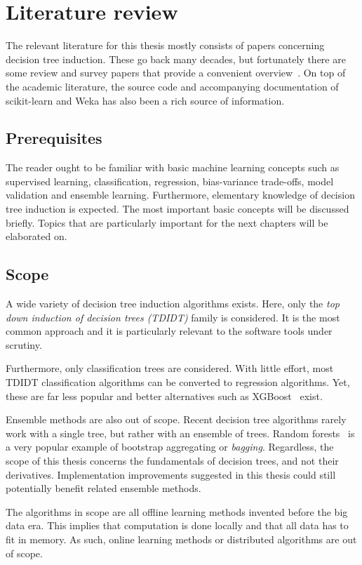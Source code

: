 \chapter{Literature review}\label{cha:literature}
The relevant literature for this thesis mostly consists of papers concerning decision tree induction. These go back many decades, but fortunately there are some review and survey papers that provide a convenient overview~\cite{murthy1998automatic, rokach2005top, kotsiantis2007supervised}. On top of the academic literature, the source code and accompanying documentation of scikit-learn and Weka has also been a rich source of information.

\section{Prerequisites}
The reader ought to be familiar with basic machine learning concepts such as supervised learning, classification, regression, bias-variance trade-offs, model validation and ensemble learning. Furthermore, elementary knowledge of decision tree induction is expected. The most important basic concepts will be discussed briefly. Topics that are particularly important for the next chapters will be elaborated on.

\section{Scope}
A wide variety of decision tree induction algorithms exists. Here, only the \emph{top down induction of decision trees (TDIDT)} family is considered. It is the most common approach and it is particularly relevant to the software tools under scrutiny.

Furthermore, only classification trees are considered. With little effort, most TDIDT classification algorithms can be converted to regression algorithms. Yet, these are far less popular and better alternatives such as XGBoost~\cite{xgboost} exist.

Ensemble methods are also out of scope. Recent decision tree algorithms rarely work with a single tree, but rather with an ensemble of trees. Random forests~\cite{rf} is a very popular example of bootstrap aggregating or \emph{bagging}. Regardless, the scope of this thesis concerns the fundamentals of decision trees, and not their derivatives. Implementation improvements suggested in this thesis could still potentially benefit related ensemble methods.

The algorithms in scope are all offline learning methods invented before the big data era. This implies that computation is done locally and that all data has to fit in memory. As such, online learning methods or distributed algorithms are out of scope.

